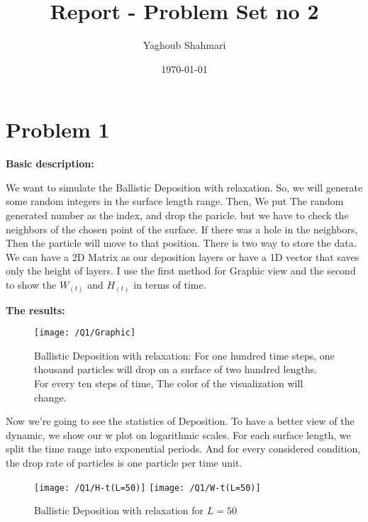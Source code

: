 \documentclass{article}
\author{Yaghoub Shahmari}
\title{Report - Problem Set no 2}
\date{\today}
\begin{document}
    \maketitle
    \section*{Problem 1}
    \textbf{Basic description:}

    We want to simulate the Ballistic Deposition with relaxation.
    So, we will generate some random integers in the surface length range.
    Then, We put The random generated number as the index, and drop the paricle.
    but we have to check the neighbors of the chosen point of the surface.
    If there was a hole in the neighbors, Then the particle will move to that position.
    There is two way to store the data. We can have a 2D Matrix as our deposition layers or have a 1D vector that saves only the height of layers.
    I use the first method for Graphic view and the second to show the $W_{(t)}$ and $H_{(t)}$ in terms of time.

    \textbf{The results:}

    \begin{figure}[!htb]
        \centering
        \texttt{[image: /Q1/Graphic]}
        \label{fig:1.1}
        \caption{Ballistic Deposition with relaxation:
        For one hundred time steps, one thousand particles will drop on a surface of two hundred lengths.
        For every ten steps of time, The color of the visualization will change.}
    \end{figure}

    \pagebreak

    Now we're going to see the statistics of Deposition.
    To have a better view of the dynamic,
    we show our w plot on logarithmic scales.
    For each surface length, we split the time range into exponential periods.
    And for every considered condition, the drop rate of particles is one particle per time unit.

    \begin{figure}[!htb]
        \centering
        \texttt{[image: /Q1/H-t(L=50)]}
        \label{fig:1.2}
        \texttt{[image: /Q1/W-t(L=50)]}
        \label{fig:1.3}
        \caption{Ballistic Deposition with relaxation for $L=50$}
    \end{figure}
\end{document}
